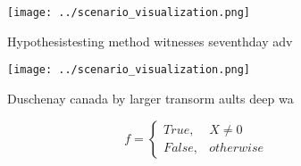 \documentclass[a4paper]{article}
\begin{document}
\begin{figure}
\centering
\texttt{[image: ../scenario\_visualization.png]}
\caption{Hypothesistesting method witnesses seventhday adv
}
\end{figure}
 
\begin{figure}
\centering
\texttt{[image: ../scenario\_visualization.png]}
\caption{Duschenay canada by larger transorm aults deep wa
}
\end{figure}
 
\begin{equation}   f =
\begin{cases} True, & X \neq 0\\
False, & otherwise
\end{cases}
\end{equation}
\end{document}
